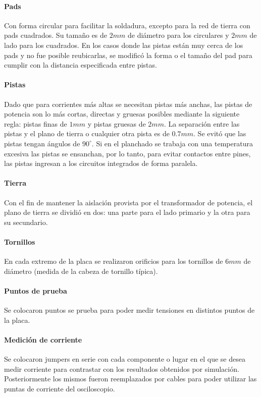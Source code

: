 \paragraph{Pads}

Con forma circular para facilitar la soldadura, excepto para la red de tierra con pads cuadrados.
Su tamaño es de $2mm$ de diámetro para los circulares y $2mm$ de lado para los cuadrados.
En los casos donde las pistas están muy cerca de los pads y no fue posible reubicarlas,
se modificó la forma o el tamaño del pad para cumplir con la distancia especificada entre pistas.  

\paragraph{Pistas}

Dado que para corrientes más altas se necesitan pistas más anchas, las pistas de potencia son lo más cortas, directas y gruesas posibles mediante la siguiente regla:
pistas finas de $1mm$ y pistas gruesas de $2mm$. 
La separación entre las pistas y el plano de tierra o cualquier otra pista es de $0.7mm$. 
Se evitó que las pistas tengan ángulos de $90^{\circ}$. 
Si en el planchado se trabaja con una temperatura excesiva las pistas se ensanchan, por lo tanto,
para evitar contactos entre pines, las pistas ingresan a los circuitos integrados de forma paralela. 

\paragraph{Tierra} 

Con el fin de mantener la aislación provista por el transformador de potencia, 
el plano de tierra se dividió en dos: una parte para el lado primario y la otra para su secundario.

\paragraph{Tornillos}

En cada extremo de la placa se realizaron orificios para los tornillos de $6mm$ de diámetro (medida de la cabeza de tornillo típica). 

\paragraph{Puntos de prueba}

Se colocaron puntos se prueba para poder medir tensiones en distintos puntos de la placa.

\paragraph{Medición de corriente} 

Se colocaron jumpers en serie con cada componente o lugar
en el que se desea medir corriente para contrastar con los resultados obtenidos por simulación.
Posteriormente los mismos fueron reemplazados por cables
para poder utilizar las puntas de corriente del osciloscopio.
